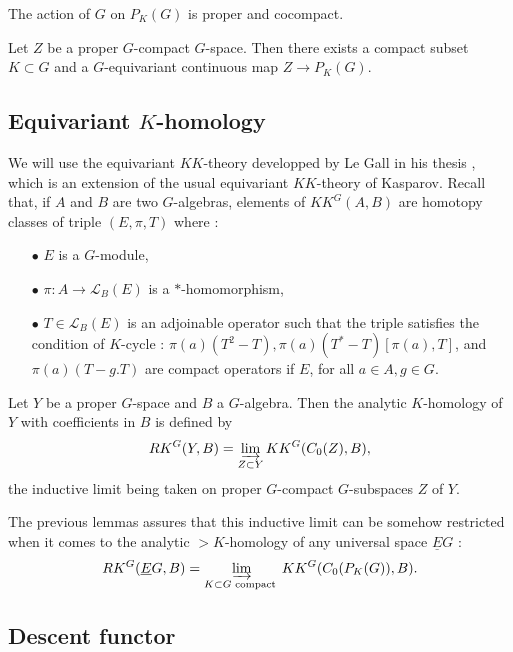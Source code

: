\begin{lem}
The action of $G$ on $P_K(G)$ is proper and cocompact.
\end{lem}  

\begin{lem}
Let $Z$ be a proper $G$-compact $G$-space. Then there exists a compact subset $K\subset G$ and a $G$-equivariant continuous map $Z\rightarrow P_K(G)$.
\end{lem}  

\subsection{Equivariant $K$-homology}

We will use the equivariant $KK$-theory developped by Le Gall in his thesis \cite{LeGall}, which is an extension of the usual equivariant $KK$-theory of Kasparov. Recall that, if $A$ and $B$ are two $G$-algebras, elements of $KK^G(A,B)$ are homotopy classes of triple $(E,\pi,T)$ where :\\

\begin{itemize}
\item[$\bullet$] $E$ is a $G$-module,
\item[$\bullet$] $\pi : A\rightarrow \mathcal L_B(E)$ is a $*$-homomorphism,
\item[$\bullet$] $T\in \mathcal L_B(E)$ is an adjoinable operator such that the triple satisfies the condition of $K$-cycle : $\pi(a)(T^2-T),\pi(a)(T^*-T)[\pi(a),T]$, and $\pi(a)(T-g.T)$ are compact operators if $E$, for all $a\in A, g\in G$.\\
\end{itemize}

\begin{definition}
Let $Y$ be a proper $G$-space and $B$ a $G$-algebra. Then the analytic $K$-homology of $Y$ with coefficients in $B$ is defined by 
\[RK^G(Y,B) = \varinjlim_{Z\subset Y} KK^G(C_0(Z),B), \]
the inductive limit being taken on proper $G$-compact $G$-subspaces $Z$ of $Y$.
\end{definition}

The previous lemmas assures that this inductive limit can be somehow restricted when it comes to the analytic $>K$-homology of any universal space $\underline E G$ :
\[RK^G(\underline E G,B) = \varinjlim_{K\subset G \text{ compact }} KK^G(C_0(P_K(G)),B).\]

\subsection{Descent functor}

